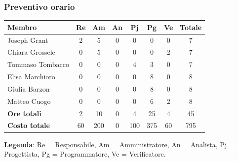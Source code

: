 \documentclass[11pt,a4paper]{article}
\begin{document}
\subsubsection{Preventivo orario}
\begin{center}
    \begin{tabular}{|l|c|c|c|c|c|c|c|}
        \hline
        \textbf{Membro} & \textbf{Re} & \textbf{Am} & \textbf{An} & \textbf{Pj} & \textbf{Pg} & \textbf{Ve} & \textbf{Totale} \\
        \hline
        Joseph Grant & 2 & 5 & 0 & 0 & 0 & 0 & 7 \\
        \hline
        Chiara Grossele & 0 & 5 & 0 & 0 & 0 & 2 & 7 \\
        \hline
        Tommaso Tombacco & 0 & 0 & 0 & 4 & 3 & 0 & 7 \\
        \hline
        Elisa Marchioro & 0 & 0 & 0 & 0 & 8 & 0 & 8 \\
        \hline
        Giulia Barzon & 0 & 0 & 0 & 0 & 8 & 0 & 8 \\
        \hline
        Matteo Cuogo & 0 & 0 & 0 & 0 & 6 & 2 & 8 \\
        \hline
        \textbf{Ore totali} & 2 & 10 & 0 & 4 & 25 & 4 & 45 \\
        \hline
        \textbf{Costo totale} & 60 & 200 & 0 & 100 & 375 & 60 & 795 \\
        \hline
    \end{tabular}
\end{center}

\noindent \textbf{Legenda}: Re = Responsabile, Am = Amministratore, An = Analista, Pj = Progettista, Pg = Programmatore, Ve = Verificatore.
\end{document}
